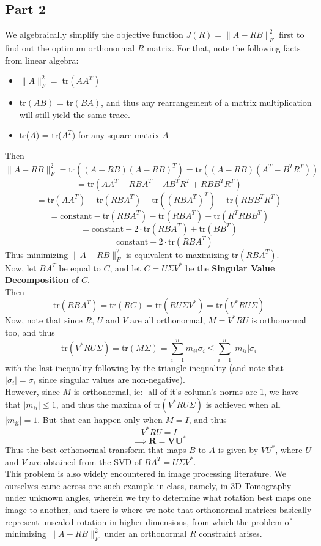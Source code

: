 \documentclass[a4paper,14pt]{article}
\numberwithin{definition}{section}
\numberwithin{mytheorem}{subsection}
\begin{document}
\subsection{Part 2}
We algebraically simplify the objective function $J(R) = \lVert A - RB\rVert^2_F$ first to find out the optimum orthonormal $R$ matrix. For that, note the following facts from linear algebra:
\begin{itemize}
    \item $\lVert A\rVert^2_F = \;$tr$(AA^T)$
    \item tr$(AB)$ = tr$(BA)$, and thus any rearrangement of a matrix multiplication will still yield the same trace.
    \item tr($A$) = tr($A^T$) for any square matrix $A$
\end{itemize}
Then 
$$\lVert A - RB\rVert^2_F = \mathrm{tr}((A - RB)(A - RB)^T) = \mathrm{tr}((A - RB)(A^T - B^TR^T))$$
$$ = \mathrm{tr}(AA^T - RBA^T - AB^TR^T + RBB^TR^T)$$
$$ = \mathrm{tr}(AA^T) - \mathrm{tr}(RBA^T) - \mathrm{tr}((RBA^T)^T) + \mathrm{tr}(RBB^TR^T)$$
$$ = \mathrm{constant} - \mathrm{tr}(RBA^T) - \mathrm{tr}(RBA^T) + \mathrm{tr}(R^TRBB^T)$$
$$ = \mathrm{constant} - 2\cdot\mathrm{tr}(RBA^T) + \mathrm{tr}(BB^T)$$
$$ = \mathrm{constant} - 2\cdot\mathrm{tr}(RBA^T)$$
Thus minimizing $\lVert A - RB\rVert^2_F$ is equivalent to maximizing $\mathrm{tr}(RBA^T)$. \\
Now, let $BA^T$ be equal to $C$, and let $C = U\Sigma V^*$ be the \textbf{Singular Value Decomposition} of $C$.\\
Then
$$\mathrm{tr}(RBA^T) = \mathrm{tr}(RC) = \mathrm{tr}(RU\Sigma V^*) = \mathrm{tr}(V^*RU\Sigma)$$
Now, note that since $R$, $U$ and $V$ are all orthonormal, $M = V^*RU$ is orthonormal too, and thus 
$$\mathrm{tr}(V^*RU\Sigma) = \mathrm{tr}(M\Sigma) = \sum^{n}_{i = 1} m_{ii}\sigma_i\leq\sum^{n}_{i = 1} |m_{ii}|\sigma_i$$
with the last inequality following by the triangle inequality (and note that $|\sigma_i| = \sigma_i$ since singular values are non-negative).\\
However, since $M$ is orthonormal, ie:- all of it's column's norms are 1, we have that $|m_{ii}|\leq 1$, and thus the maxima of $\mathrm{tr}(V^*RU\Sigma)$ is achieved when all $|m_{ii}| = 1$. But that can happen only when $M = I$, and thus
$$V^*RU = I $$
$$\boldsymbol{\implies R = VU^*}$$
Thus the best orthonormal transform that maps $B$ to $A$ is given by $VU^*$, where $U$ and $V$ are obtained from the SVD of $BA^T = U\Sigma V^*$.\\
This problem is also widely encountered in image processing literature. We ourselves came across one such example in class, namely, in 3D Tomography under unknown angles, wherein we try to determine what rotation best maps one image to another, and there is where we note that orthonormal matrices basically represent unscaled rotation in higher dimensions, from which the problem of minimizing $\lVert A - RB\rVert^2_F$ under an orthonormal $R$ constraint arises.
\end{document}
